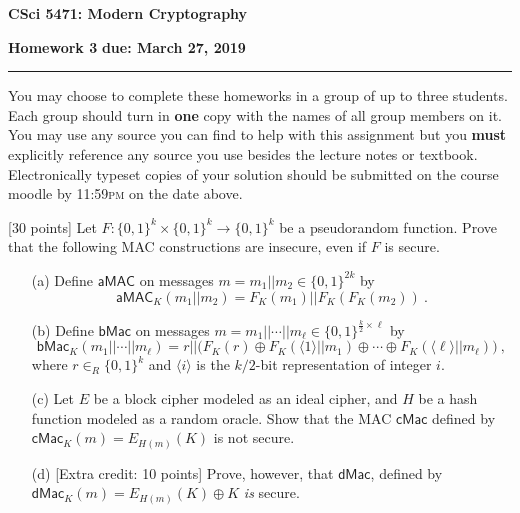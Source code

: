\documentclass[11pt]{article}
\newcounter{qnum}
\newcommand{\question}[1]{\stepcounter{qnum}\bigskip\noindent{\bf \arabic{qnum}. #1.}}
\begin{document}
\begin{center}
{\Large \bf CSci 5471: Modern Cryptography}
\end{center}
{\bf Homework 3} \hfill {\bf due: March 27, 2019}
\medskip
\hrule
\medskip
{} You may choose to complete these
homeworks in a group of up to three students.  Each group should turn
in {\bf one} copy with the names of all group members on it.  You may
use any source you can find to help with this assignment but you {\bf
  must} explicitly reference any source you use besides the lecture
notes or textbook.  Electronically typeset copies of your solution
should be submitted on the course moodle by 11:59\textsc{pm} on the
date above.

\question{Broken MACs} [30 points]  Let $F : \{0,1\}^k \times
\{0,1\}^k \rightarrow \{0,1\}^k$ be a pseudorandom function.  Prove
that the following MAC constructions are insecure, even if $F$ is secure.
\begin{itemize}
\item[(a)] Define $\textsf{aMAC}$ on messages $m
  = m_1 || m_2 \in \{0,1\}^{2k}$  by $$\textsf{aMAC}_K(m_1||m_2) = F_K(m_1) ||
  F_K(F_K(m_2))\ .$$  
\item[(b)] Define $\textsf{bMac}$ on messages $m = m_1 || \cdots || m_\ell
  \in \{0,1\}^{\frac{k}{2} \times\ell}$ by $$\textsf{bMac}_K(m_1 || \cdots ||
  m_\ell) = r || \bigl( F_K(r) \oplus F_K(\langle 1 \rangle || m_1) \oplus
  \cdots \oplus F_K(\langle \ell \rangle || m_\ell) \bigr) \ ,$$ where $r \in_R
  \{0,1\}^k$ and $\langle i \rangle$ is the $k/2$-bit
  representation of integer $i$.
\item[(c)] Let $E$ be a block cipher modeled as an ideal cipher, and
  $H$ be a hash function modeled as a random oracle.  Show
  that the MAC $\textsf{cMac}$ defined by $\textsf{cMac}_K(m) =
  E_{H(m)}(K)$ is not secure.
\item[(d)] [Extra credit: 10 points] Prove, however, that
  $\textsf{dMac}$, defined by $\textsf{dMac}_K(m) = E_{H(m)}(K)\oplus
  K$ {\em is} secure.
\end{itemize}
\end{document}
